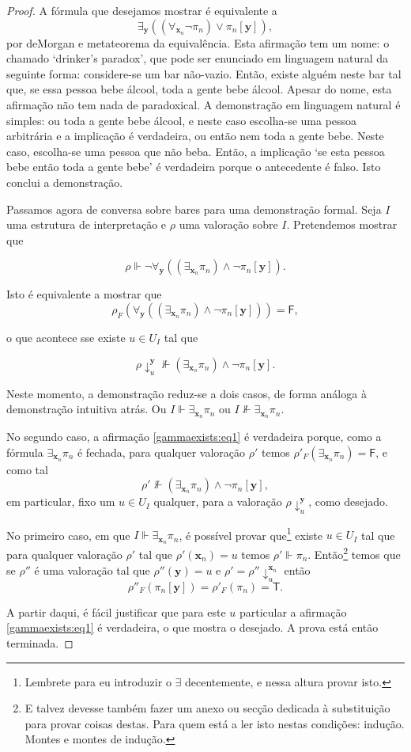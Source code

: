 \documentclass{report}
\theoremstyle{definition}
\theoremstyle{remark}
\renewcommand{\bf}[1]{\mathbf{#1}}
\newcommand{\lt}{\mathsf{T}}
\newcommand{\lf}{\mathsf{F}}
\begin{document}
\begin{proof}
	A fórmula que desejamos mostrar é equivalente a
	\[\exists_{\bf y}((\forall_{\bf x_n} \neg \pi_n) \lor \pi_n[\bf y]),\]
	por deMorgan e metateorema da equivalência. Esta afirmação tem um nome: o chamado `drinker's paradox', que pode ser enunciado em linguagem natural da seguinte forma: considere-se um bar não-vazio. Então, existe alguém neste bar tal que, se essa pessoa bebe álcool, toda a gente bebe álcool. Apesar do nome, esta afirmação não tem nada de paradoxical. A demonstração em linguagem natural é simples: ou toda a gente bebe álcool, e neste caso escolha-se uma pessoa arbitrária e a implicação é verdadeira, ou então nem toda a gente bebe. Neste caso, escolha-se uma pessoa que não beba. Então, a implicação `se esta pessoa bebe então toda a gente bebe' é verdadeira porque o antecedente é falso. Isto conclui a demonstração.
	
	Passamos agora de conversa sobre bares para uma demonstração formal. Seja $I$ uma estrutura de interpretação e $\rho$ uma valoração sobre $I$. Pretendemos mostrar que
	
	\[\rho \Vdash \neg \forall_{\bf y}((\exists_{\bf x_n} \pi_n) \land \neg \pi_n[\bf y]).\]
	
	Isto é equivalente a mostrar que
	\[\rho_F(\forall_{\bf y}((\exists_{\bf x_n} \pi_n) \land \neg \pi_n[\bf y])) = \lf,\]
	
	o que acontece sse existe $u \in U_I$ tal que
	
	\begin{equation}\label{gammaexists:eq1}
	\rho\!\downarrow^{\bf y}_u \nVdash (\exists_{\bf x_n} \pi_n) \land \neg \pi_n[\bf y].
	\end{equation}
	
	Neste momento, a demonstração reduz-se a dois casos, de forma análoga à demonstração intuitiva atrás. Ou $I \Vdash \exists_{\bf x_n} \pi_n$ ou $I \nVdash \exists_{\bf x_n} \pi_n$.
	
	No segundo caso, a afirmação \eqref{gammaexists:eq1} é verdadeira porque, como a fórmula $\exists_{\bf x_n} \pi_n$ é fechada, para qualquer valoração $\rho'$ temos $\rho'_F(\exists_{\bf x_n} \pi_n) = \lf$, e como tal
	\[\rho' \nVdash (\exists_{\bf x_n} \pi_n) \land \neg \pi_n[\bf y],\]
	em particular, fixo um $u \in U_I$ qualquer, para a valoração $\rho\!\downarrow^{\bf y}_u$, como desejado.
	
	No primeiro caso, em que $I \Vdash \exists_{\bf x_n} \pi_n$, é possível provar que\footnote{Lembrete para eu introduzir o $\exists$ decentemente, e nessa altura provar isto.} existe $u \in U_I$ tal que para qualquer valoração $\rho'$ tal que $\rho'(\bf x_n) = u$ temos $\rho' \Vdash \pi_n$. Então\footnote{E talvez devesse também fazer um anexo ou secção dedicada à substituição para provar coisas destas. Para quem está a ler isto nestas condições: indução. Montes e montes de indução.} temos que se $\rho''$ é uma valoração tal que $\rho''(\bf y) = u$ e $\rho' = \rho''\!\downarrow^{\bf x_n}_u$ então
	\[\rho''_F(\pi_n[\bf y]) = \rho'_F(\pi_n) = \lt.\]
	
	A partir daqui, é fácil justificar que para este $u$ particular a afirmação \eqref{gammaexists:eq1} é verdadeira, o que mostra o desejado. A prova está então terminada.
	\end{proof}
	
\end{document}
